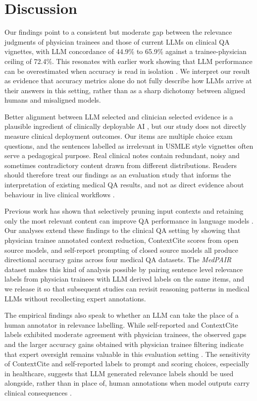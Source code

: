 \documentclass[fleqn,10pt]{wlscirep}
\begin{document}
\section{Discussion}

Our findings point to a consistent but moderate gap between the relevance judgments of physician trainees and those of current LLMs on clinical QA vignettes, with LLM concordance of 44.9\% to 65.9\% against a trainee-physician ceiling of 72.4\%. This resonates with earlier work showing that LLM performance can be overestimated when accuracy is read in isolation \cite{bao_llms_2024, ishii_analysis_2024, de2024text}. We interpret our result as evidence that accuracy metrics alone do not fully describe how LLMs arrive at their answers in this setting, rather than as a sharp dichotomy between aligned humans and misaligned models.

Better alignment between LLM selected and clinician selected evidence is a plausible ingredient of clinically deployable AI \cite{gourabathina2025medperturb}, but our study does not directly measure clinical deployment outcomes. Our items are multiple choice exam questions, and the sentences labelled as irrelevant in USMLE style vignettes often serve a pedagogical purpose. Real clinical notes contain redundant, noisy and sometimes contradictory content drawn from different distributions. Readers should therefore treat our findings as an evaluation study that informs the interpretation of existing medical QA results, and not as direct evidence about behaviour in live clinical workflows \cite{yang_harnessing_2023}.

Previous work has shown that selectively pruning input contexts and retaining only the most relevant content can improve QA performance in language models \cite{mckechnie_context_2025, kabongo_effective_2024}. Our analyses extend these findings to the clinical QA setting by showing that physician trainee annotated context reduction, ContextCite scores from open source models, and self-report prompting of closed source models all produce directional accuracy gains across four medical QA datasets. The \emph{MedPAIR} dataset makes this kind of analysis possible by pairing sentence level relevance labels from physician trainees with LLM derived labels on the same items, and we release it so that subsequent studies can revisit reasoning patterns in medical LLMs without recollecting expert annotations.

The empirical findings also speak to whether an LLM can take the place of a human annotator in relevance labelling. While self-reported and ContextCite labels exhibited moderate agreement with physician trainees, the observed gaps and the larger accuracy gains obtained with physician trainee filtering indicate that expert oversight remains valuable in this evaluation setting \cite{shi_judging_2025, zheng_judging_2023, soboroff_dont_2025, qiu2025quantifying}. The sensitivity of ContextCite and self-reported labels to prompt and scoring choices, especially in healthcare, suggests that LLM generated relevance labels should be used alongside, rather than in place of, human annotations when model outputs carry clinical consequences \cite{li2025medguide, abbasiantaeb_can_2024}.
\end{document}
